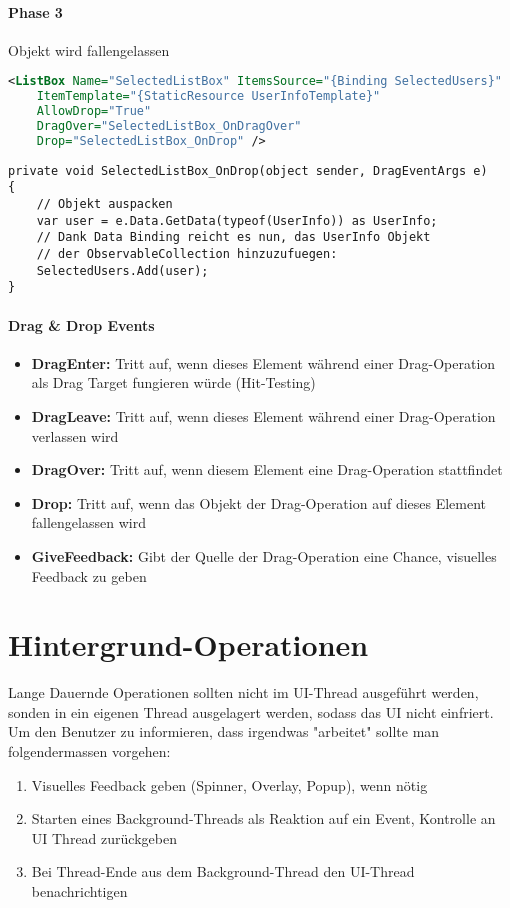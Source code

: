 \paragraph{Phase 3} Objekt wird fallengelassen
\begin{lstlisting}[language=xml]
<ListBox Name="SelectedListBox" ItemsSource="{Binding SelectedUsers}"
    ItemTemplate="{StaticResource UserInfoTemplate}"
    AllowDrop="True"
    DragOver="SelectedListBox_OnDragOver"
    Drop="SelectedListBox_OnDrop" />
\end{lstlisting}
\begin{lstlisting}
private void SelectedListBox_OnDrop(object sender, DragEventArgs e)
{
    // Objekt auspacken
    var user = e.Data.GetData(typeof(UserInfo)) as UserInfo;
    // Dank Data Binding reicht es nun, das UserInfo Objekt
    // der ObservableCollection hinzuzufuegen:
    SelectedUsers.Add(user);
}
\end{lstlisting}
\paragraph{Drag \& Drop Events}
\begin{itemize}
\item \textbf{DragEnter:} Tritt auf, wenn dieses Element während einer Drag-Operation als Drag Target fungieren würde (Hit-Testing)
\item \textbf{DragLeave:} Tritt auf, wenn dieses Element während einer Drag-Operation verlassen wird
\item \textbf{DragOver:} Tritt auf, wenn diesem Element eine Drag-Operation stattfindet
\item \textbf{Drop:} Tritt auf, wenn das Objekt der Drag-Operation auf dieses Element fallengelassen wird
\item \textbf{GiveFeedback:} Gibt der Quelle der Drag-Operation eine Chance, visuelles Feedback zu geben
\end{itemize}
\section{Hintergrund-Operationen}
Lange Dauernde Operationen sollten nicht im UI-Thread ausgeführt werden, sonden in ein eigenen Thread ausgelagert werden, sodass das UI nicht einfriert. Um den Benutzer zu informieren, dass irgendwas "{}arbeitet"{} sollte man folgendermassen vorgehen:
\begin{enumerate}
\item Visuelles Feedback geben (Spinner, Overlay, Popup), wenn nötig
\item Starten eines Background-Threads als Reaktion auf ein Event, Kontrolle an UI Thread zurückgeben
\item Bei Thread-Ende aus dem Background-Thread den UI-Thread benachrichtigen
\end{enumerate}
